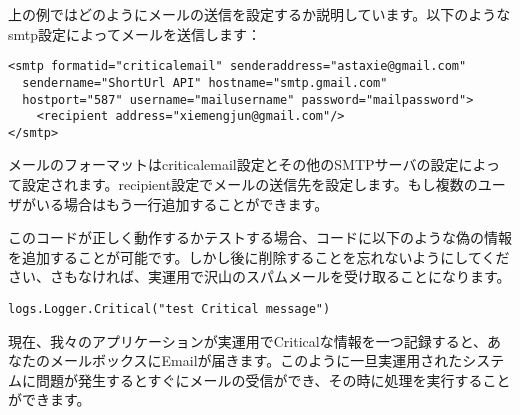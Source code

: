 上の例ではどのようにメールの送信を設定するか説明しています。以下のようなsmtp設定によってメールを送信します：

\begin{lstlisting}[numbers=none]
<smtp formatid="criticalemail" senderaddress="astaxie@gmail.com"
  sendername="ShortUrl API" hostname="smtp.gmail.com"
  hostport="587" username="mailusername" password="mailpassword">
    <recipient address="xiemengjun@gmail.com"/>
</smtp>
\end{lstlisting}

メールのフォーマットはcriticalemail設定とその他のSMTPサーバの設定によって設定されます。recipient設定でメールの送信先を設定します。もし複数のユーザがいる場合はもう一行追加することができます。

このコードが正しく動作するかテストする場合、コードに以下のような偽の情報を追加することが可能です。しかし後に削除することを忘れないようにしてください、さもなければ、実運用で沢山のスパムメールを受け取ることになります。

\begin{lstlisting}[numbers=none]
logs.Logger.Critical("test Critical message")
\end{lstlisting}

現在、我々のアプリケーションが実運用でCriticalな情報を一つ記録すると、あなたのメールボックスにEmailが届きます。このように一旦実運用されたシステムに問題が発生するとすぐにメールの受信ができ、その時に処理を実行することができます。
